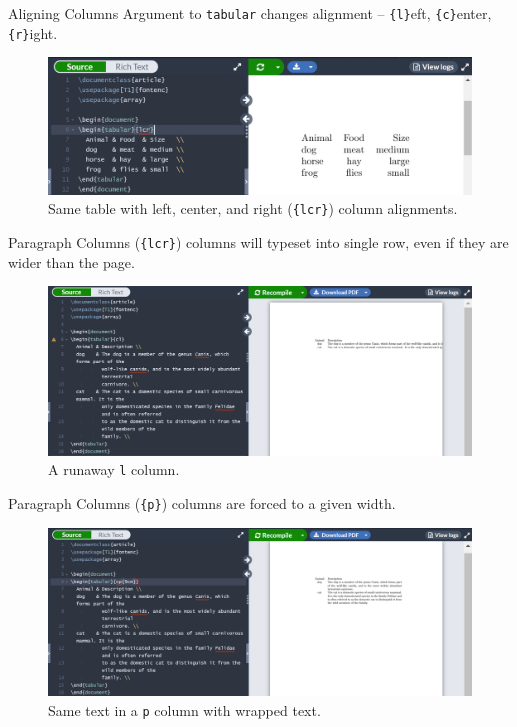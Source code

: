 \documentclass{beamer}
\begin{document}
{  \begin{frame}{Aligning Columns}
    Argument to \texttt{tabular} changes alignment -- \texttt{\{l\}}eft, \texttt{\{c\}}enter, \texttt{\{r\}}ight.
    \begin{figure}
      \includegraphics[width=0.9\linewidth]{day01-overleaf-11B-table-align.png}
      \caption{Same table with left, center, and right (\texttt{\{lcr\}}) column alignments.}
      \label{fig:day01-overleaf-11B}
    \end{figure}
  \end{frame}

  \begin{frame}{Paragraph Columns}
    (\texttt{\{lcr\}}) columns will typeset into single row, even if they are wider than the page.
    \begin{figure}
      \includegraphics[width=0.9\linewidth]{day01-overleaf-11C-table-overflow.png}
      \caption{A runaway \texttt{l} column.}
      \label{fig:day01-overleaf-11C}
    \end{figure}
  \end{frame}

  \begin{frame}{Paragraph Columns}
    (\texttt{\{p\}}) columns are forced to a given width.
    \begin{figure}
      \includegraphics[width=0.9\linewidth]{day01-overleaf-11D-table-overflow.png}
      \caption{Same text in a \texttt{p} column with wrapped text.}
      \label{fig:day01-overleaf-11D}
    \end{figure}
  \end{frame}

}
\end{document}
